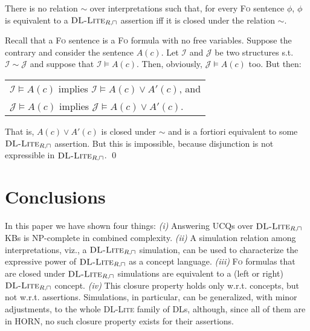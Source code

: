 \documentclass[11pt]{llncs}
\newcommand{\logic}[1]{\textsc{#1}\xspace}
\newcommand{\FOL}{\logic{Fo}}
\newcommand{\g}[1]{\logic{#1}}
\newcommand{\f}[1]{\mathcal{#1}}
\newcommand{\NP}{\textsc{NP}\xspace}
\newcommand{\dlliterc}{\g{DL-Lite}_{R,\sqcap}\xspace}
\begin{document}
\begin{theorem}
There is no relation $\sim$ over interpretations 
such that,
for every \FOL sentence $\phi$, $\phi$ is equivalent to a
$\dlliterc$ assertion iff it is closed under 
the relation $\sim$.
\end{theorem}

\proof Recall that a \FOL sentence is a 
\FOL formula with no free variables.
Suppose the contrary and consider the sentence
$A(c)$. Let $\f{I}$ and $\f{J}$ be two 
structures s.t. $\f{I} \sim \f{J}$ and suppose that
$\f{I} \models A(c)$. Then, obviously, $\f{J} \models A(c)$ too.
But then:
\begin{center}
\begin{tabular}{l}
$\f{I} \models A(c)$ implies $\f{I} \models A(c) \lor A'(c)$, and\\
$\f{J} \models A(c)$ implies $\f{J} \models A(c) \lor A'(c)$.
\end{tabular}
\end{center}
That is,  $A(c) \lor A'(c)$ is closed under $\sim$ and is a fortiori
equivalent to some
$\dlliterc$ assertion.
But this is impossible, because disjunction is not expressible
in $\dlliterc$. \qed

\section{Conclusions}\label{five}


In this paper we have shown four things:
\textit{(i)} Answering UCQs over $\dlliterc$ KBs is \NP-complete in
combined complexity.
\textit{(ii)} A simulation relation among interpretations, viz., a $\dlliterc$ simulation, 
can be used to characterize the expressive power of $\dlliterc$ as a
concept language.
\textit{(iii)} \FOL formulas that are closed under $\dlliterc$ simulations
are equivalent to a (left or right) $\dlliterc$ concept.
\textit{(iv)} This closure property holds only w.r.t. concepts, but not w.r.t.
assertions. 
Simulations, in particular, can be generalized, with minor adjustments, to
the whole \g{DL-Lite} family of DLs, although, since all of them are in
\g{HORN}, no such closure property exists for their assertions.



\end{document}
